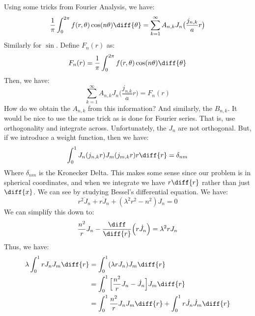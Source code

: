 \documentclass[crop=false,class=book,oneside]{standalone}
\begin{document}
            Using some tricks from Fourier Analysis, we have:
            \begin{equation}
                \frac{1}{\pi}\int_{0}^{2\pi}
                    f(r,\theta)\cos(n\theta)\diff{\theta}
                =\sum_{k=1}^{\infty}A_{n,k}
                    J_{n}\big(\frac{j_{n,k}}{a}r\big)
            \end{equation}
            Similarly for $\sin$. Define $F_{n}(r)$ as:
            \begin{equation}
                F_{n}(r)=\frac{1}{\pi}\int_{0}^{2\pi}
                    f(r,\theta)\cos(n\theta)\diff{\theta}
            \end{equation}
            Then, we have:
            \begin{equation}
                \sum_{k=1}^{\infty}A_{n,k}J_{n}
                    \big(\frac{j_{n.k}}{a}r\big)
                =F_{n}(r)
            \end{equation}
            How do we obtain the $A_{n,k}$ from this information?
            And similarly, the $B_{n,k}$. It would be nice to use
            the same trick as is done for Fourier series. That is,
            use orthogonality and integrate across. Unfortunately,
            the $J_{n}$ are not orthogonal. But, if we introduce
            a weight function, then we have:
            \begin{equation}
                \int_{0}^{1}J_{n}(j_{n,k}r)J_{m}(j_{m,k}r)r\diff{r}
                =\delta_{nm}
            \end{equation}
            Where $\delta_{nm}$ is the Kronecker Delta. This makes
            some sense since our problem is in spherical
            coordinates, and when we integrate we have
            $r\diff{r}$ rather than just $\diff{x}$. We can see
            by studying Bessel's differential equation. We have:
            \begin{equation}
                r^{2}\ddot{J}_{n}+r\dot{J}_{n}+
                (\lambda^{2}r^{2}-n^{2})J_{n}=0
            \end{equation}
            We can simplify this down to:
            \begin{equation}
                \frac{n^{2}}{r}J_{n}-\frac{\diff}{\diff{r}}\Big(
                    r\dot{J}_{n}\Big)
                =\lambda^{2}rJ_{n}
            \end{equation}
            Thus, we have:
            \begin{subequations}
                \begin{align}
                    \lambda\int_{0}^{1}rJ_{n}J_{m}\diff{r}
                    &=\int_{0}^{1}(\lambda{r}J_{n})J_{m}\diff{r}\\
                    &=\int_{0}^{1}\Big[\frac{n^{2}}{r}J_{n}-
                        \dot{J}_{n}\Big]
                        J_{m}\diff{r}\\
                    &=\int_{0}^{1}\frac{n^{2}}{r}J_{n}J_{m}\diff{r}+
                        \int_{0}^{1}r\dot{J}_{n}\dot{J}_{m}\diff{r}
                \end{align}
            \end{subequations}
\end{document}
